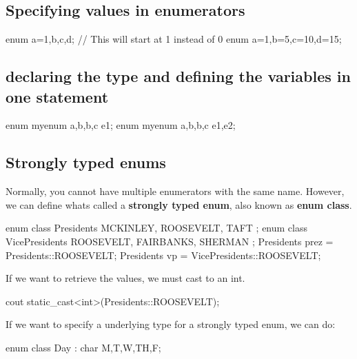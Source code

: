\documentclass{report}
\begin{document}
    \pagebreak
    \subsection{Specifying values in enumerators}
    \bigbreak \noindent 
    
    \begin{cppcode}
enum {a=1,b,c,d}; // This will start at 1 instead of 0
enum {a=1,b=5,c=10,d=15}; 
    \end{cppcode}
    
    \bigbreak \noindent 
    \subsection{declaring the type and defining the variables in one statement}
    \bigbreak \noindent 
    
    \begin{cppcode}
enum myenum {a,b,b,c} e1;
enum myenum {a,b,b,c} e1,e2;
    \end{cppcode}
    

    \bigbreak \noindent 
    \subsection{Strongly typed enums}
    \bigbreak \noindent 
    Normally, you cannot have multiple enumerators with the same name. However, we can define whats called a \textbf{strongly typed enum}, also known as \textbf{enum class}.
    \bigbreak \noindent 
    
    \begin{cppcode}
enum class Presidents { MCKINLEY, ROOSEVELT, TAFT }; 
enum class VicePresidents { ROOSEVELT, FAIRBANKS, SHERMAN };
Presidents prez = Presidents::ROOSEVELT;
Presidents vp = VicePresidents::ROOSEVELT;
    \end{cppcode}
    
    \bigbreak \noindent 
    If we want to retrieve the values, we must cast to an int.
    \bigbreak \noindent 
    
    \begin{cppcode}
cout static_cast<int>(Presidents::ROOSEVELT);
    \end{cppcode}
    
    \bigbreak \noindent 
    If we want to specify a underlying type for a strongly typed enum, we can do:
    \bigbreak \noindent 
    
    \begin{cppcode}
enum class Day : char {M,T,W,TH,F};
    \end{cppcode}
    
\end{document}
